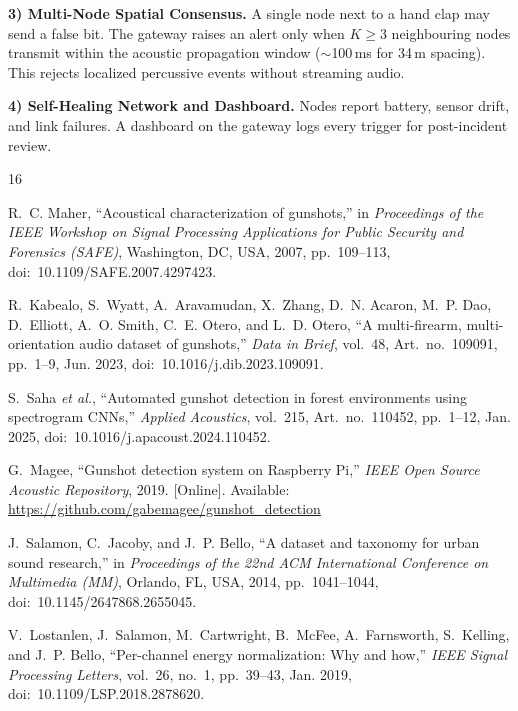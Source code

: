 \documentclass[conference]{IEEEtran}
\begin{document}
\textbf{3) Multi-Node Spatial Consensus.} A single node next to a hand clap may send a false bit. The gateway raises an alert only when $K \ge 3$ neighbouring nodes transmit within the acoustic propagation window ($\sim$100\,ms for 34\,m spacing). This rejects localized percussive events without streaming audio.

\textbf{4) Self-Healing Network and Dashboard.} Nodes report battery, sensor drift, and link failures. A dashboard on the gateway logs every trigger for post-incident review.

\begin{thebibliography}{16}

R.~C. Maher, ``Acoustical characterization of gunshots,'' in \emph{Proceedings of the IEEE Workshop on Signal Processing Applications for Public Security and Forensics (SAFE)}, Washington, DC, USA, 2007, pp.~109--113, doi:~10.1109/SAFE.2007.4297423.

R.~Kabealo, S.~Wyatt, A.~Aravamudan, X.~Zhang, D.~N. Acaron, M.~P. Dao, D.~Elliott, A.~O. Smith, C.~E. Otero, and L.~D. Otero, ``A multi-firearm, multi-orientation audio dataset of gunshots,'' \emph{Data in Brief}, vol.~48, Art.~no.~109091, pp.~1--9, Jun. 2023, doi:~10.1016/j.dib.2023.109091.

S.~Saha \emph{et al.}, ``Automated gunshot detection in forest environments using spectrogram CNNs,'' \emph{Applied Acoustics}, vol.~215, Art.~no.~110452, pp.~1--12, Jan. 2025, doi:~10.1016/j.apacoust.2024.110452.

G.~Magee, ``Gunshot detection system on Raspberry Pi,'' \emph{IEEE Open Source Acoustic Repository}, 2019. [Online]. Available: \url{https://github.com/gabemagee/gunshot_detection}

J.~Salamon, C.~Jacoby, and J.~P. Bello, ``A dataset and taxonomy for urban sound research,'' in \emph{Proceedings of the 22nd ACM International Conference on Multimedia (MM)}, Orlando, FL, USA, 2014, pp.~1041--1044, doi:~10.1145/2647868.2655045.

V.~Lostanlen, J.~Salamon, M.~Cartwright, B.~McFee, A.~Farnsworth, S.~Kelling, and J.~P. Bello, ``Per-channel energy normalization: Why and how,'' \emph{IEEE Signal Processing Letters}, vol.~26, no.~1, pp.~39--43, Jan. 2019, doi:~10.1109/LSP.2018.2878620.


\end{thebibliography}
\end{document}

